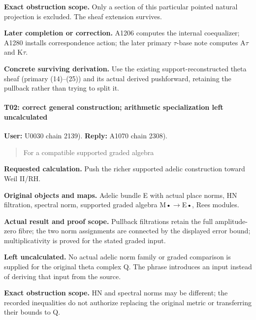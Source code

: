 \textbf{Exact obstruction scope.} Only a section of this particular
pointed natural projection is excluded. The sheaf extension survives.

\textbf{Later completion or correction.} A1206 computes the internal
coequalizer; A1280 installs correspondence action; the later primary
\allowbreak{}\ensuremath{τ}\allowbreak{}-base note computes
A\allowbreak{}\ensuremath{τ}\allowbreak{} and
K\allowbreak{}\ensuremath{τ}\allowbreak{}.

\textbf{Concrete surviving derivation.} Use the existing
support-reconstructed theta sheaf (primary (14)--(25)) and its actual
derived pushforward, retaining the pullback rather than trying to split
it.

\paragraph{T02: correct general construction; arithmetic specialization
left
uncalculated}\label{t02-correct-general-construction-arithmetic-specialization-left-uncalculated}

\textbf{User:} U0030
\protect{} chain 2139).
\textbf{Reply:} A1070
\protect{} chain 2308).

\begin{quote}
For a compatible supported graded algebra
\end{quote}

\textbf{Requested calculation.} Push the richer supported adelic
construction toward Weil II/RH.

\textbf{Original objects and maps.} Adelic bundle E with actual place
norms, HN filtration, spectral norm, supported graded algebra
M•\allowbreak{}\ensuremath{→}\allowbreak{}E•, Rees modules.

\textbf{Actual result and proof scope.} Pullback filtrations retain the
full amplitude-zero fibre; the two norm assignments are connected by the
displayed error bound; multiplicativity is proved for the stated graded
input.

\textbf{Left uncalculated.} No actual adelic norm family or graded
comparison is supplied for the original theta complex Q. The phrase
introduces an input instead of deriving that input from the source.

\textbf{Exact obstruction scope.} HN and spectral norms may be
different; the recorded inequalities do not authorize replacing the
original metric or transferring their bounds to Q.

